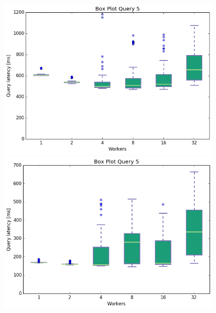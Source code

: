 \documentclass[11pt,singlecolumn]{scrartcl}
\begin{document}
\begin{figure}[!tbp]
  \centering
  \RawFloats
  \begin{minipage}[b]{0.5\textwidth}
    \includegraphics[width=\textwidth]{boxesjl/q5}
  \end{minipage}
  \hfill
  \begin{minipage}[b]{0.5\textwidth}
    \includegraphics[width=\textwidth]{boxesjs/q5}
  \end{minipage}
\end{figure}
\clearpage
\end{document}
